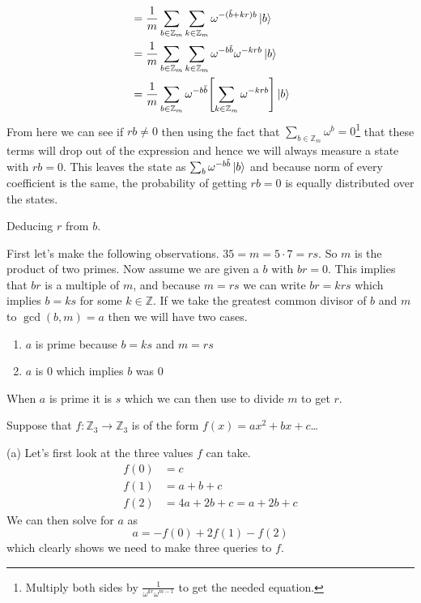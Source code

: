 \documentclass[boxes,pages]{homework}
\begin{document}
\begin{solution}
\begin{align*}
		             & = \frac{1}{m}\sum_{b\in\mathbb{Z}_m}\sum_{k\in\mathbb{Z}_m}\omega^{-(\tilde{b} + kr)b}\ket{b}             \\
		             & = \frac{1}{m}\sum_{b\in\mathbb{Z}_m}\sum_{k\in\mathbb{Z}_m}\omega^{-b\tilde{b}}\omega^{-krb}\ket{b}       \\
		             & = \frac{1}{m}\sum_{b\in\mathbb{Z}_m}\omega^{-b\tilde{b}}\qty[\sum_{k\in\mathbb{Z}_m}\omega^{-krb}]\ket{b}
	\end{align*}
	From here we can see if $rb \neq 0$ then using the fact that $\sum_{b\in\mathbb{Z}_m}\omega^{b} = 0$\footnote{Multiply both sides by $\frac{1}{\omega^{kr}\omega^{m - 1}}$ to get the needed equation.} that these terms will drop out of the expression and hence we will always measure a state with $rb = 0$. This leaves the state as $\sum_b\omega^{-b\tilde{b}}\ket{b}$ and because norm of every coefficient is the same, the probability of getting $rb = 0$ is equally distributed over the states.
\end{solution}

\begin{problem}
Deducing $r$ from $b$.
\end{problem}

\begin{solution}
	First let's make the following observations. $35 = m = 5\cdot 7 = rs$. So $m$ is the product of two primes. Now assume we are given a $b$ with $br = 0$. This implies that $br$ is a multiple of $m$, and because $m = rs$ we can write $br = krs$ which implies $b = ks$ for some $k\in\mathbb{Z}$. If we take the greatest common divisor of $b$ and $m$ to $\gcd(b, m) = a$ then we will have two cases.
	\begin{enumerate}
		\item $a$ is prime because $b = ks$ and $m = rs$
		\item $a$ is 0 which implies $b$ was 0
	\end{enumerate}
	When $a$ is prime it is $s$ which we can then use to divide $m$ to get $r$.
\end{solution}


\begin{problem}
Suppose that $f: \mathbb{Z}_3\to\mathbb{Z}_3$ is of the form $f(x) = ax^2 + bx + c$\dots
\end{problem}

\begin{solution}
	(a) Let's first look at the three values $f$ can take.
	\begin{align*}
		f(0) & = c                        \\
		f(1) & = a + b + c                \\
		f(2) & = 4a + 2b + c = a + 2b + c
	\end{align*}
	We can then solve for $a$ as
	\begin{equation*}
		a = -f(0) + 2f(1) - f(2)
	\end{equation*}
	which clearly shows we need to make three queries to $f$.
\end{solution}
\end{document}
